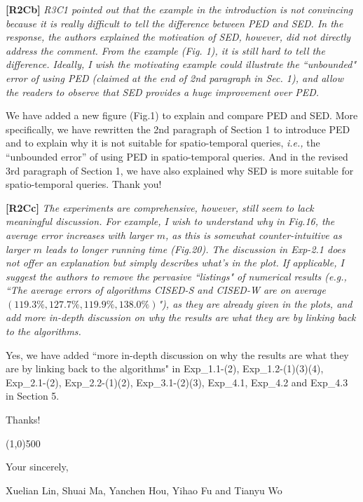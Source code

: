 \documentclass{letter}
\newcommand{\ie}{\emph{i.e.,}\xspace}
\begin{document}
\textbf{[R2Cb]} \emph{{R3C1} pointed out that the example in the introduction is not convincing because it is really difficult to tell the difference between PED and SED. In the response, the authors explained the motivation of SED, however, did not directly address the comment. From the example (Fig. 1), it is still hard to tell the difference. Ideally, I wish the motivating example could illustrate the ``unbounded" error of using PED (claimed at the end of 2nd paragraph in Sec. 1), and allow the readers to observe that SED provides a huge improvement over PED.}

We have added a new figure (Fig.1) to explain and compare PED and SED. More specifically, we have rewritten the 2nd paragraph of Section 1 to introduce PED and to explain why it is not suitable for spatio-temporal queries, \ie the ``unbounded error'' of using PED in spatio-temporal queries. And in the revised 3rd paragraph of Section 1, we have also explained why SED is more suitable for spatio-temporal queries.
Thank you!

\textbf{[R2Cc]} \emph{The experiments are comprehensive, however, still seem to lack meaningful discussion. For example, I wish to understand why in Fig.16, the average error increases with larger $m$, as this is somewhat counter-intuitive as larger $m$ leads to longer running time (Fig.20). The discussion in Exp-2.1 does not offer an explanation but simply describes what's in the plot. If applicable, I suggest the authors to remove the pervasive ``listings" of numerical results (e.g., ``The average errors of algorithms CISED-S and CISED-W are on average $(119.3\%, 127.7\%, 119.9\%, 138.0\%)$"), as they are already given in the plots, and add more in-depth discussion on why the results are what they are by linking back to the algorithms. }

Yes, we have added ``more in-depth discussion on why the results are what they are by linking back to the algorithms" in Exp\_1.1-(2), Exp\_1.2-(1)(3)(4), Exp\_2.1-(2), Exp\_2.2-(1)(2), Exp\_3.1-(2)(3), Exp\_4.1, Exp\_4.2 and Exp\_4.3 in Section 5.


Thanks!


\line(1,0){500}



Your sincerely,

Xuelian Lin, Shuai Ma, Yanchen Hou, Yihao Fu and Tianyu Wo

%
%
\end{document}
